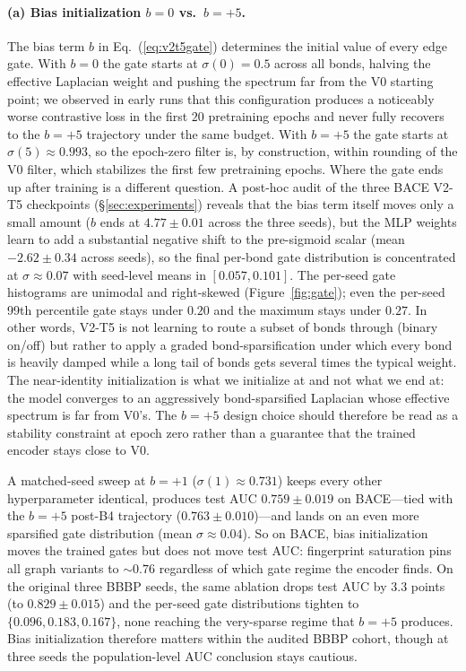 \documentclass[sigconf,nonacm,anonymous,review]{acmart}
\begin{document}
\paragraph{(a) Bias initialization $b{=}0$ vs.\ $b{=}{+}5$.}
The bias term $b$ in Eq.~(\ref{eq:v2t5gate}) determines the initial value of every edge gate. With $b{=}0$ the gate starts at $\sigma(0){=}0.5$ across all bonds, halving the effective Laplacian weight and pushing the spectrum far from the V0 starting point; we observed in early runs that this configuration produces a noticeably worse contrastive loss in the first $20$ pretraining epochs and never fully recovers to the $b{=}{+}5$ trajectory under the same budget. With $b{=}{+}5$ the gate starts at $\sigma(5)\approx 0.993$, so the epoch-zero filter is, by construction, within rounding of the V0 filter, which stabilizes the first few pretraining epochs. Where the gate ends up after training is a different question. A post-hoc audit of the three BACE V2-T5 checkpoints (\S\ref{sec:experiments}) reveals that the bias term itself moves only a small amount ($b$ ends at $4.77\pm 0.01$ across the three seeds), but the MLP weights learn to add a substantial negative shift to the pre-sigmoid scalar (mean $-2.62 \pm 0.34$ across seeds), so the final per-bond gate distribution is concentrated at $\sigma\approx 0.07$ with seed-level means in $[0.057, 0.101]$. The per-seed gate histograms are unimodal and right-skewed (Figure~\ref{fig:gate}); even the per-seed 99th percentile gate stays under $0.20$ and the maximum stays under $0.27$. In other words, V2-T5 is not learning to route a subset of bonds through (binary on/off) but rather to apply a graded bond-sparsification under which every bond is heavily damped while a long tail of bonds gets several times the typical weight. The near-identity initialization is what we initialize at and not what we end at: the model converges to an aggressively bond-sparsified Laplacian whose effective spectrum is far from V0's. The $b{=}{+}5$ design choice should therefore be read as a stability constraint at epoch zero rather than a guarantee that the trained encoder stays close to V0.

A matched-seed sweep at $b{=}{+}1$ ($\sigma(1)\approx 0.731$) keeps every other hyperparameter identical, produces test AUC $0.759 \pm 0.019$ on BACE---tied with the $b{=}{+}5$ post-B4 trajectory ($0.763 \pm 0.010$)---and lands on an even more sparsified gate distribution (mean $\sigma\approx 0.04$). So on BACE, bias initialization moves the trained gates but does not move test AUC: fingerprint saturation pins all graph variants to $\sim$$0.76$ regardless of which gate regime the encoder finds. On the original three BBBP seeds, the same ablation drops test AUC by $3.3$ points (to $0.829 \pm 0.015$) and the per-seed gate distributions tighten to $\{0.096, 0.183, 0.167\}$, none reaching the very-sparse regime that $b{=}{+}5$ produces. Bias initialization therefore matters within the audited BBBP cohort, though at three seeds the population-level AUC conclusion stays cautious.
\end{document}
